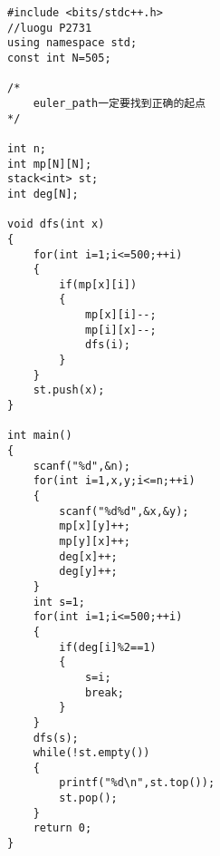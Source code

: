 \begin{lstlisting}
#include <bits/stdc++.h>
//luogu P2731
using namespace std;
const int N=505;

/*
	euler_path一定要找到正确的起点
*/

int n;
int mp[N][N];
stack<int> st;
int deg[N];

void dfs(int x)
{
	for(int i=1;i<=500;++i)
	{
		if(mp[x][i])
		{
			mp[x][i]--;
			mp[i][x]--;
			dfs(i);
		}
	}
	st.push(x);
}

int main()
{
	scanf("%d",&n);
	for(int i=1,x,y;i<=n;++i)
	{
		scanf("%d%d",&x,&y);
		mp[x][y]++;
		mp[y][x]++;
		deg[x]++;
		deg[y]++;
	}
	int s=1;
	for(int i=1;i<=500;++i)
	{
		if(deg[i]%2==1)
		{
			s=i;
			break;
		}
	}
	dfs(s);
	while(!st.empty())
	{
		printf("%d\n",st.top());
		st.pop();
	}
	return 0;
}
\end{lstlisting}